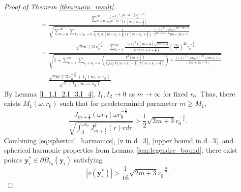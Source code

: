 \documentclass[11pt,reqno,oneside]{amsart}
\numberwithin{equation}{section}
\theoremstyle{definition}
\theoremstyle{remark}
\numberwithin{equation}{section}
\begin{document}
\begin{proof}[Proof of Theorem \ref{thm:main_result}]
\begin{equation*}
\begin{aligned}
				&=\frac{\sum_{k=0}^{\infty}\frac{(-1)^{k}\omega^{m+2k+\frac{3}{2}}r_{0}^{m+2k}}{k!2^{m+2k+\frac{1}{2}}\Gamma(m+k+\frac{3}{2})}}{\sqrt{\sum_{k=0}^{\infty}\sum_{k_1+k_2=k}\frac{1}{k_1{!}k_2{!}\Gamma(m+k_1+\frac{3}{2})\Gamma(m+k_2+\frac{3}{2})}\frac{(-1)^k(\omega r_0)^{2m+2k+3}}{2^{2m+2k+1}2m+2k+3}}}\\
				&=\frac{\sqrt{2m+3}r_0^{-\frac{3}{2}}+\sum_{k=1}^{\infty}\frac{(-1)^k\Gamma(m+\frac{3}{2})\sqrt{2m+3} }{k!\Gamma(m+k+\frac{3}{2})}\left(\frac{\omega r_0}{2}\right)^{2k}r_0^{-\frac{3}{2}}}{\sqrt{1+\sum_{k=1}^{\infty}\sum_{k_1+k_2=k}\left(\frac{\Gamma^2(m+\frac{3}{2})}{k_1!k_2!\Gamma(m+k_1+\frac{3}{2})\Gamma(m+k_2+\frac{3}{2})}\right)\times\frac{(-1)^k(\omega r_0/2)^{2k}(2m+3)}{(2m+2k+3)}}}\\
				&=\frac{\sqrt{2m+3}r_0^{-\frac{3}{2}}+I_1(m,\omega, r_0)}{\sqrt{1+I_2(m,\omega, r_0)}}.
			\end{aligned}
		\end{equation*}
		By Lemma \ref{I_1,I_2,I_3,I_4}, $I_1, I_2 \to 0$ as $m \to \infty$ for fixed $r_0$. Thus, there exists $M_1(\omega,r_0)$ such that for predetermined parameter $m \geqslant M_1$,
		\begin{equation}\label{upper bound in d=3}
			\frac{J_{m+\frac{1}{2}}(\omega r_0) \omega r_0^{-\frac{1}{2}}}{\sqrt{\int_0^{\omega r_0} J_{m+\frac{1}{2}}^2(r) r  dr}} > \frac{1}{2} \sqrt{2m+3}  r_0^{-\frac{3}{2}}.
		\end{equation}
		Combining \eqref{eq:spherical_harmonics}, \eqref{v in d=3}, \eqref{upper bound in d=3}, and spherical harmonic properties from Lemma \ref{lem:legendre_bound}, there exist points $\mathbf{y}^*_i \in \partial B_{r_0}(\mathbf{y}_i)$ satisfying
		\begin{equation}\label{3.12}
			|v(\mathbf{y}^*_i)| > \frac{1}{16} \sqrt{2m+3}  r_0^{-\frac{3}{2}}.
		\end{equation}
		

\end{proof}
\end{document}
